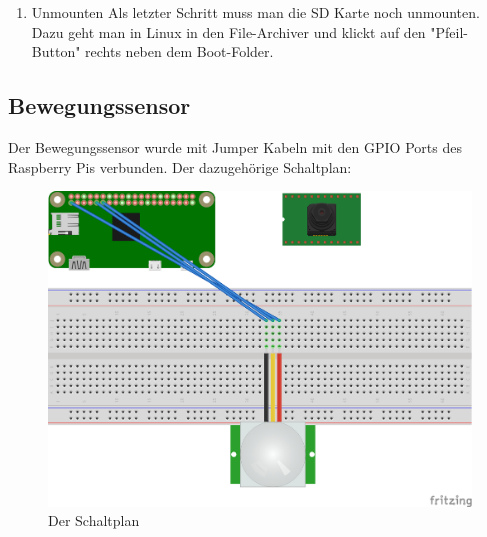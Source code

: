 \begin{enumerate}
\begin{listing}
\begin{code}[firstnumber=last]{python}
            while sendmail() != True:
                try:
                    print("Trying ... ")
                except KeyboardInterrupt as e:
                    print("\nUser interrupt detected ...")
                    print("Email was not sent. Please check your connectivity!")
            break
        \end{code}
        \caption{Python script um eine email zu senden}
    \end{listing}

    Dieses Python File muss auch noch auf \textit{executable} gesetzt werden. Dazu:

    \begin{listing}
        \begin{code}[firstnumber=last]{sh}
            sudo chmod +x sendIP.py
        \end{code}
        \caption{Python datei als executable markieren}
    \end{listing}

    \item Unmounten
    Als letzter Schritt muss man die SD Karte noch unmounten. Dazu geht man in Linux in den File-Archiver und klickt auf den "Pfeil-Button" rechts neben dem Boot-Folder.
\end{enumerate}

\subsection{Bewegungssensor}
Der Bewegungssensor wurde mit Jumper Kabeln mit den GPIO Ports des Raspberry Pis verbunden. Der dazugehörige Schaltplan:
\begin{figure}
  \centering
    \includegraphics[width=\textwidth]{images/Schaltplan}
  \caption{Der Schaltplan}
\end{figure}
